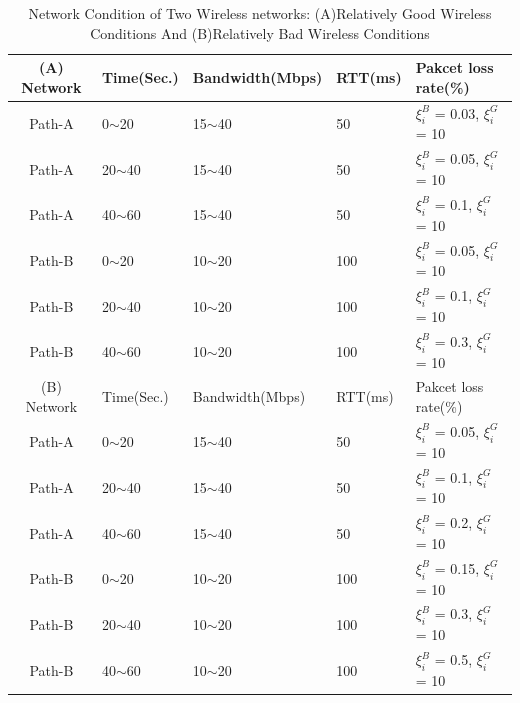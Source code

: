 \begin{table}
	\centering 
	\scriptsize
	\begin{tabular}{cp{0.95cm}p{1.6cm}p{0.8cm}p{2.0cm}}
		\rowcolor[gray]{0.9} 
		\hline
		(A) Network &  Time(Sec.)    & Bandwidth(Mbps)       &  RTT(ms) &  Pakcet loss rate(\%) \\
		\hline
		Path-A  &  0${\sim}$20   &  15${\sim}$40         &     50   &  $\xi _i^B$ = 0.03, $\xi _i^G$ = 10\\
		
		Path-A  &  20${\sim}$40  &  15${\sim}$40         &     50   &  $\xi _i^B$ = 0.05, $\xi _i^G$ = 10\\ 
		
		Path-A  &  40${\sim}$60  &  15${\sim}$40         &     50   &  $\xi _i^B$ = 0.1,  $\xi _i^G$ = 10\\   
		
		Path-B  &  0${\sim}$20   &  10${\sim}$20         &     100  &  $\xi _i^B$ = 0.05, $\xi _i^G$ = 10\\
		
		Path-B 	&  20${\sim}$40  &  10${\sim}$20         &     100  &  $\xi _i^B$ = 0.1,  $\xi _i^G$ = 10\\	
		
		Path-B 	&  40${\sim}$60  &  10${\sim}$20         &     100  &  $\xi _i^B$ = 0.3,  $\xi _i^G$ = 10\\  	
		
		\hline
		\rowcolor[gray]{0.9}
		\hline
		(B) Network &   Time(Sec.)   & Bandwidth(Mbps)       &  RTT(ms) &     Pakcet loss rate(\%)  \\
		
		Path-A  &  0${\sim}$20   &  15${\sim}$40         &    50    &  $\xi _i^B$ = 0.05, $\xi _i^G$ = 10\\
		
		Path-A  &  20${\sim}$40  &  15${\sim}$40         &    50    &  $\xi _i^B$ = 0.1,  $\xi _i^G$ = 10\\ 
		
		Path-A  &  40${\sim}$60  &  15${\sim}$40         &    50    &  $\xi _i^B$ = 0.2,  $\xi _i^G$ = 10\\     
		
		Path-B  &  0${\sim}$20   &  10${\sim}$20         &    100   &  $\xi _i^B$ = 0.15, $\xi _i^G$ = 10\\
		
		Path-B  &  20${\sim}$40  &  10${\sim}$20         &    100   &  $\xi _i^B$ = 0.3,  $\xi _i^G$ = 10\\	
		
		Path-B  &  40${\sim}$60  &  10${\sim}$20         &    100   &  $\xi _i^B$ = 0.5,  $\xi _i^G$ = 10\\ 
		
		\hline
		
	\end{tabular}
	\caption{Network Condition of Two Wireless networks: (A)Relatively Good Wireless Conditions And (B)Relatively Bad Wireless Conditions}
	\label{}
\end{table}



